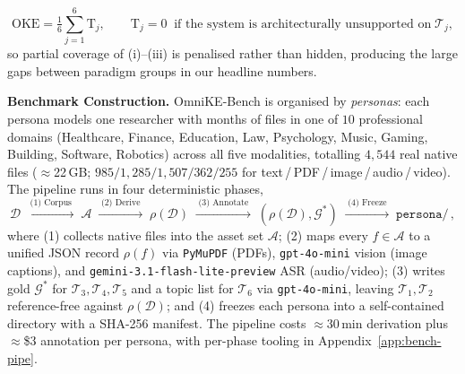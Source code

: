 \documentclass{article}
\begin{document}
\begin{equation}
\mathrm{OKE}\!=\!\tfrac{1}{6}\!\sum_{j=1}^{6}\mathrm{T}_j,\qquad \mathrm{T}_j\!=\!0\;\;\text{if the system is architecturally unsupported on}\;\mathcal{T}_j,
\label{eq:oke}
\end{equation}
so partial coverage of (i)--(iii) is penalised rather than hidden, producing the large gaps between paradigm groups in our headline numbers.

\textbf{Benchmark Construction.} OmniKE-Bench is organised by \emph{personas}: each persona models one researcher with months of files in one of $10$ professional domains (Healthcare, Finance, Education, Law, Psychology, Music, Gaming, Building, Software, Robotics) across all five modalities, totalling $4{,}544$ real native files ($\approx$22\,GB; $985/1{,}285/1{,}507/362/255$ for text\,/\,PDF\,/\,image\,/\,audio\,/\,video). The pipeline runs in four deterministic phases,
\begin{equation}
\mathcal{D}\;\xrightarrow{\;\text{(1) Corpus}\;}\;\mathcal{A}\;\xrightarrow{\;\text{(2) Derive}\;}\;\rho(\mathcal{D})\;\xrightarrow{\;\text{(3) Annotate}\;}\;(\rho(\mathcal{D}),\mathcal{G}^{*})\;\xrightarrow{\;\text{(4) Freeze}\;}\;\texttt{persona/}\,,
\label{eq:pipe}
\end{equation}
where (1) collects native files into the asset set $\mathcal{A}$; (2) maps every $f\!\in\!\mathcal{A}$ to a unified JSON record $\rho(f)$ via \texttt{PyMuPDF} (PDFs), \texttt{gpt-4o-mini} vision (image captions), and \texttt{gemini-3.1-flash-lite-preview} ASR (audio/video); (3) writes gold $\mathcal{G}^{*}$ for $\mathcal{T}_3,\mathcal{T}_4,\mathcal{T}_5$ and a topic list for $\mathcal{T}_6$ via \texttt{gpt-4o-mini}, leaving $\mathcal{T}_1,\mathcal{T}_2$ reference-free against $\rho(\mathcal{D})$; and (4) freezes each persona into a self-contained directory with a SHA-256 manifest. The pipeline costs $\approx$$30$\,min derivation plus $\approx$\$3 annotation per persona, with per-phase tooling in Appendix~\ref{app:bench-pipe}.
\end{document}
